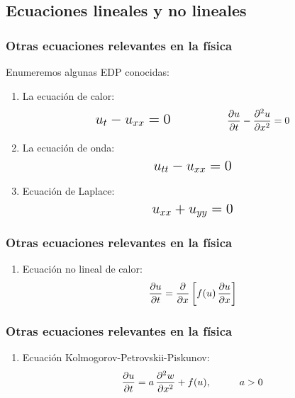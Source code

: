 \documentclass[12pt]{beamer}
\begin{document}
\subsection{Ecuaciones lineales y no lineales}

\begin{frame}
\frametitle{Otras ecuaciones relevantes en la física}
Enumeremos algunas EDP conocidas:
\pause
{}
\begin{enumerate}[<+->]
\item La ecuación de calor:
\begin{align*}
\text{\Large{$u_{t} - u_{xx} = 0$}} \hspace{2cm} \pdv{u}{t} - \pdv[2]{u}{x} = 0
\end{align*}
\item La ecuación de onda:
\begin{align*}
\text{\Large{$u_{tt} - u_{xx} = 0$}}
\end{align*}
\item Ecuación de Laplace:
\begin{align*}
\text{\Large{$u_{xx} + u_{yy} = 0$}}
\end{align*}
\seti
\end{enumerate}
\end{frame}
\begin{frame}
\frametitle{Otras ecuaciones relevantes en la física}
\begin{enumerate}[<+->]
\conti
\item Ecuación no lineal de calor:
\begin{align*}
\pdv{u}{t} = \pdv{x} \left[ f(u) \, \pdv{u}{x} \right]
\end{align*}
\seti
\end{enumerate}
\end{frame}
\begin{frame}
\frametitle{Otras ecuaciones relevantes en la física}
\begin{enumerate}[<+->]
\conti
\item Ecuación Kolmogorov-Petrovskii-Piskunov:
\begin{align*}
\pdv{u}{t} = a \, \pdv[2]{w}{x} + f(u), \hspace{1cm} a > 0
\end{align*}
\seti
\end{enumerate}
\end{frame}
\end{document}
